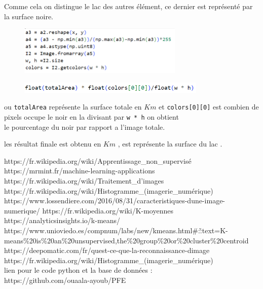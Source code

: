 \documentclass[a4paper,12pt]{report}
\begin{document}
Comme cela on distingue le lac des autres élément, ce dernier est représenté par la surface noire.

\begin{figure}[!h]
    \includegraphics[width=0.7\textwidth]{recon.PNG}
\end{figure}

\begin{figure}[!h]
    \includegraphics[width=0.8\textwidth]{area.PNG}
\end{figure}

ou \texttt{totalArea} représente la surface totale en $Km$ et \texttt{colors[0][0]} est combien de pixels occupe le noir en la divisant par \texttt{w * h} on obtient \\le pourcentage du noir par rapport a l'image totale.

les résultat finale est obtenu en $Km$ , est représente la surface du lac .
\begin{thebibliography}{99}
	https://fr.wikipedia.org/wiki/Apprentissage\_non\_supervisé
    https://mrmint.fr/machine-learning-applications
    https://fr.wikipedia.org/wiki/Traitement\_d'images
    https://fr.wikipedia.org/wiki/Histogramme\_(imagerie\_numérique)
    https://www.lossendiere.com/2016/08/31/caracteristiques-dune-image-numerique/
    https://fr.wikipedia.org/wiki/K-moyennes
    https://analyticsinsights.io/k-means/
    https://www.unioviedo.es/compnum/labs/new/kmeans.html\#:\~:text=K-means\%20is\%20an\%20unsupervised,the\%20group\%20or\%20cluster\%20centroid
    https://deepomatic.com/fr/quest-ce-que-la-reconnaissance-dimage
    https://fr.wikipedia.org/wiki/Histogramme\_(imagerie\_numérique)\\
    
    lien pour le code python et la base de données :\\
    https://github.com/ouaala-ayoub/PFE
    
\end{thebibliography}

\end{document}
